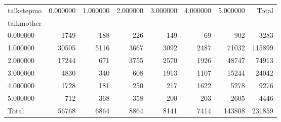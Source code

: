 \begin{tabular}{lrrrrrrr}
\toprule
talkstepmo & 0.000000 & 1.000000 & 2.000000 & 3.000000 & 4.000000 & 5.000000 & Total \\
talkmother &  &  &  &  &  &  &  \\
\midrule
0.000000 & 1749 & 188 & 226 & 149 & 69 & 902 & 3283 \\
1.000000 & 30505 & 5116 & 3667 & 3092 & 2487 & 71032 & 115899 \\
2.000000 & 17244 & 671 & 3755 & 2570 & 1926 & 48747 & 74913 \\
3.000000 & 4830 & 340 & 608 & 1913 & 1107 & 15244 & 24042 \\
4.000000 & 1728 & 181 & 250 & 217 & 1622 & 5278 & 9276 \\
5.000000 & 712 & 368 & 358 & 200 & 203 & 2605 & 4446 \\
Total & 56768 & 6864 & 8864 & 8141 & 7414 & 143808 & 231859 \\
\bottomrule
\end{tabular}

